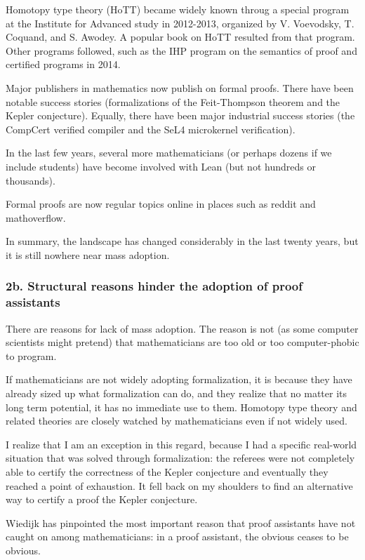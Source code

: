 \documentclass[12pt]{amsart}
\renewcommand{\~}{\ }
\renewcommand{\_}{\textunderscore}
\begin{document}
Homotopy type theory (HoTT) became widely known throug a special
program at the Institute for Advanced study in 2012-2013, organized by
V. Voevodsky, T. Coquand, and S. Awodey.  A popular book on HoTT
resulted from that program.  Other programs followed, such as the IHP
program on the semantics of proof and certified programs in 2014.

Major publishers in mathematics now publish on formal
proofs.
There have been notable success stories (formalizations of the
Feit-Thompson theorem and the Kepler conjecture).  Equally, there have
been major industrial success stories (the CompCert verified compiler
and the SeL4 microkernel verification).

In the last few years, several more mathematicians (or perhaps dozens
if we include students) have become involved with Lean (but not
hundreds or thousands).

Formal proofs are now regular topics online in places such as
reddit and mathoverflow.

In summary, the landscape has changed considerably in the last twenty
years, but it is still nowhere near mass adoption.

\subsubsection*{2b. Structural reasons hinder the adoption of proof assistants}
There are reasons for lack of mass adoption.  The reason is
not (as some computer scientists might pretend) that mathematicians
are too old or too computer-phobic to program.

If mathematicians are not widely adopting formalization, it is because
they have already sized up what formalization can do, and they realize
that no matter its long term potential, it has no immediate use to
them.  Homotopy type theory and related theories are closely watched
by mathematicians even if not widely used.

I realize that I am an exception in this regard, because I had a
specific real-world situation that was solved through formalization:
the referees were not completely able to certify the correctness of
the Kepler conjecture and eventually they reached a point of
exhaustion.  It fell back on my shoulders to find an alternative way
to certify a proof the Kepler conjecture.

Wiedijk has pinpointed the most important reason that proof assistants
have not caught on among mathematicians: in a proof assistant, the
obvious ceases to be obvious.
\end{document}
